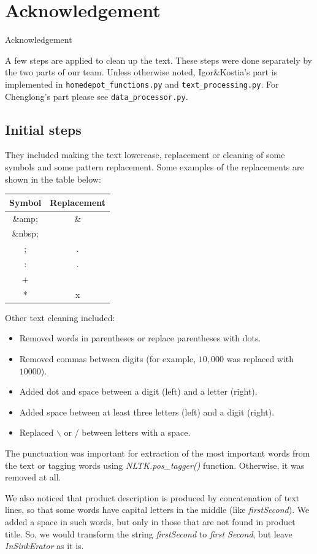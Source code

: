 \documentclass[12pt]{article}
\begin{document}
{{\section{Acknowledgement}

Acknowledgement

A few steps are applied to clean up the text. These steps were done separately by the two parts of our team. Unless otherwise noted, Igor\&Kostia's part is implemented in \texttt{homedepot\_functions.py} and  \texttt{text\_processing.py}. For Chenglong's part please see \texttt{data\_processor.py}.

\subsection{Initial steps}
They included making the text lowercase, replacement or cleaning of some symbols and some pattern replacement.
Some examples of the replacements are shown in the table below:

\begin{tabular}{|c|c|}
  \hline
  Symbol & Replacement \\ \hline
  \&amp; & \& \\ \hline
 \&nbsp; &  \\ \hline
  ; & . \\ \hline
: & . \\ \hline
+ &  \\ \hline
* &  x \\ \hline
\end{tabular}

Other text cleaning included:
\begin{itemize}
\item Removed words in parentheses or replace parentheses with dots.
\item Removed commas between digits (for example, $10,000$ was replaced with $10000$).
\item Added dot and space between a digit (left) and a letter (right).
\item Added space between at least three letters (left) and a digit (right).
\item Replaced  $\backslash$ or / between letters with a space.
\end{itemize}

The punctuation was important for extraction of the most important words from the text or tagging words using \emph{NLTK.pos\_tagger()} function. Otherwise, it was removed at all.

We also noticed that product description is produced by concatenation of text lines, so that some words have capital letters in the middle (like \emph{firstSecond}). We added a space in such words, but only in those that are not found in product title. So, we would transform the string \emph{firstSecond} to \emph{first Second}, but leave \emph{InSinkErator} as it is.

}}
\end{document}

